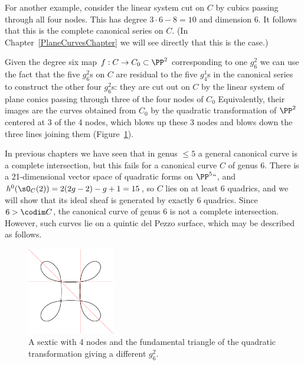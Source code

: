For another example, consider the linear system cut on $C$ by cubics
passing through all four nodes. This has degree $3\cdot 6 - 8 = 10$
and dimension 6. It follows that this is the
complete canonical series
%
on $C$. (In Chapter~\ref{PlaneCurvesChapter} we will see directly that
this is the case.)

Given the degree six map $f : C \to C_0 \subset \PP^2$ corresponding
to one $g^2_6$ we can use the fact that the five $g^2_6$s on $C$ are
residual to the five $g^1_4$s in the canonical series to construct the
other four $g^2_6$s: they are cut out on $C$ by the linear system of plane
conics passing through three of the four nodes of $C_0$  Equivalently,
their images are the curves obtained from $C_{0}$ by the quadratic
transformation
of $\PP^{2}$ centered at 3 of the 4 nodes, which blows up these 3 nodes
and blows down the three lines
 joining them (Figure~\ref{plane sextics 3}).

 In previous chapters we have seen that in genus $\leq 5$ a general
 canonical curve is  a complete intersection, but this fails for a
%
 canonical curve $C$ of genus 6. There is a 21-dimensional vector space of
quadratic forms on $\PP^5` `$, and $h^0(\sO_C(2)) = 2(2g-2)-g+1 = 15$,
so $C$ lies on at least 6 quadrics, and we will show that its ideal sheaf
is generated by exactly 6 quadrics. Since $6>\codim C$, the canonical
curve of genus 6 is not a complete intersection. However, such curves
lie on a quintic del Pezzo surface, which may be described as follows.
%
%


\begin{figure}
\centerline {\includegraphics[height=1.5in,trim=10 10 10 10,clip]{main/Fig11-4-new}}
\caption{A sextic with 4 nodes and the fundamental triangle of the
quadratic transformation giving
a different $g^{2}_{6}$.}
\label{plane sextics 3}
\end{figure}


